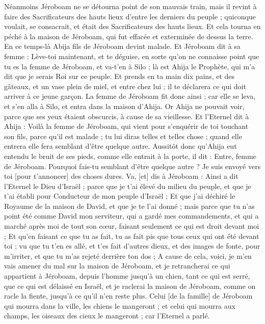 \begin{multicols}{2}
Néanmoins Jéroboam ne se détourna point de son mauvais train, mais il revint à faire des Sacrificateurs des hauts lieux d'entre les derniers du peuple ; quiconque voulait, se consacrait, et était des Sacrificateurs des hauts lieux.
Et cela tourna en péché à la maison de Jéroboam, qui fut effacée et exterminée de dessus la terre.
\VerseOne{}En ce temps-là Abija fils de Jéroboam devint malade.
Et Jéroboam dit à sa femme : Lève-toi maintenant, et te déguise, en sorte qu'on ne connaisse point que tu es la femme de Jéroboam, et va-t'en à Silo ; là est Ahija le Prophète, qui m'a dit que je serais Roi sur ce peuple.
Et prends en ta main dix pains, et des gâteaux, et un vase plein de miel, et entre chez lui ; il te déclarera ce qui doit arriver à ce jeune garçon.
La femme de Jéroboam fit donc ainsi ; car elle se leva, et s'en alla à Silo, et entra dans la maison d'Ahija. Or Ahija ne pouvait voir, parce que ses yeux étaient obscurcis, à cause de sa vieillesse.
Et l'Eternel dit à Ahija : Voilà la femme de Jéroboam, qui vient pour s'enquérir de toi touchant son fils, parce qu'il est malade ; tu lui diras telles et telles chose ; quand elle entrera elle fera semblant d'être quelque autre.
Aussitôt donc qu'Ahija eut entendu le bruit de ses pieds, comme elle entrait à la porte, il dit : Entre, femme de Jéroboam. Pourquoi fais-tu semblant d'être quelque autre ? Je suis envoyé vers toi [pour t'annoncer] des choses dures.
Va, [et] dis à Jéroboam : Ainsi a dit l'Eternel le Dieu d'Israël ; parce que je t'ai élevé du milieu du peuple, et que je t'ai établi pour Conducteur de mon peuple d'Israël ;
Et que j'ai déchiré le Royaume de la maison de David, et que je te l'ai donné ; mais parce que tu n'as point été comme David mon serviteur, qui a gardé mes commandements, et qui a marché après moi de tout son cœur, faisant seulement ce qui est droit devant moi ;
Et qu'en faisant ce que tu as fait, tu as fait pis que tous ceux qui ont été devant toi ; vu que tu t'en es allé, et t'es fait d'autres dieux, et des images de fonte, pour m'irriter, et que tu m'as rejeté derrière ton dos ;
A cause de cela, voici, je m'en vais amener du mal sur la maison de Jéroboam, et je retrancherai ce qui appartient à Jéroboam, depuis l'homme jusqu'à un chien, tant ce qui est serré, que ce qui est délaissé en Israël, et je raclerai la maison de Jéroboam, comme on racle la fiente, jusqu'à ce qu'il n'en reste plus.
Celui [de la famille] de Jéroboam qui mourra dans la ville, les chiens le mangeront ; et celui qui mourra aux champs, les oiseaux des cieux le mangeront ; car l'Eternel a parlé.

\end{multicols}
